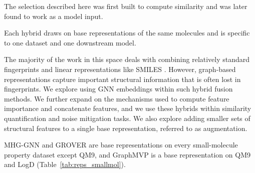 
The selection described here was first built to compute similarity and was later found to work as a model input.

Each hybrid draws on base representations of the same molecules and is specific to one dataset and one downstream model.

The majority of the work in this space deals with combining relatively standard fingerprints and linear representations like SMILES \citep{Xie2020, Laufktter2019}. However, graph-based representations capture important structural information that is often lost in fingerprints. We explore using GNN embeddings within such hybrid fusion methods. We further expand on the mechanisms used to compute feature importance and concatenate features, and we use these hybrids within similarity quantification and noise mitigation tasks. We also explore adding smaller sets of structural features to a single base representation, referred to as augmentation. 

MHG-GNN and GROVER are base representations on every small-molecule property dataset except QM9, and GraphMVP is a base representation on QM9 and LogD (Table~\ref{tab:reps_smallmol}).

